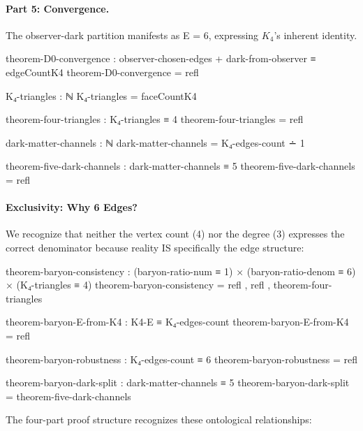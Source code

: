 \documentclass[11pt,a4paper]{book}
\begin{document}
\paragraph{Part 5: Convergence.}
The observer-dark partition manifests as E = 6, expressing $K_4$'s inherent identity.

\begin{code}
theorem-D0-convergence : observer-chosen-edges + dark-from-observer ≡ edgeCountK4
theorem-D0-convergence = refl

K₄-triangles : ℕ
K₄-triangles = faceCountK4

theorem-four-triangles : K₄-triangles ≡ 4
theorem-four-triangles = refl

dark-matter-channels : ℕ
dark-matter-channels = K₄-edges-count ∸ 1

theorem-five-dark-channels : dark-matter-channels ≡ 5
theorem-five-dark-channels = refl
\end{code}

\paragraph{Exclusivity: Why 6 Edges?}

We recognize that neither the vertex count (4) nor the degree (3) expresses the correct denominator because reality IS specifically the edge structure:

\begin{code}
theorem-baryon-consistency : (baryon-ratio-num ≡ 1)
                           × (baryon-ratio-denom ≡ 6)
                           × (K₄-triangles ≡ 4)
theorem-baryon-consistency = refl
                           , refl
                           , theorem-four-triangles

theorem-baryon-E-from-K4 : K4-E ≡ K₄-edges-count
theorem-baryon-E-from-K4 = refl

theorem-baryon-robustness : K₄-edges-count ≡ 6
theorem-baryon-robustness = refl

theorem-baryon-dark-split : dark-matter-channels ≡ 5
theorem-baryon-dark-split = theorem-five-dark-channels
\end{code}

The four-part proof structure recognizes these ontological relationships:
\end{document}
